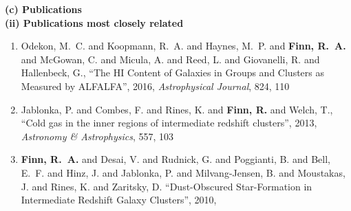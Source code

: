 \documentclass[11pt]{article}
\begin{document}
\begin{flushleft}
\medskip
{\bf (c) Publications} \\
\medskip
{\bf (ii) Publications most closely related} \\
\begin{enumerate}{\setlength{\leftmargin}{0in}}
\vspace{-.2cm}\item {{Odekon}, M.~C. and {Koopmann}, R.~A. and {Haynes}, M.~P. and 
	{\bf{Finn}, R.~A.} and {McGowan}, C. and {Micula}, A. and {Reed}, L. and 
	{Giovanelli}, R. and {Hallenbeck}, G.}, ``{The HI Content of
        Galaxies in Groups and Clusters as Measured by ALFALFA}'',
      2016, {\it Astrophysical Journal},
      824, 110
\vspace{-.2cm}\item {Jablonka}, P. and {Combes}, F. and {Rines}, K. and {\bf {Finn}, R.} and 
	{Welch}, T., ``{Cold gas in the inner regions of intermediate
        redshift clusters}'', 2013, {\it Astronomy \& Astrophysics},
      557, 103
\vspace{-.2cm}
\item {\bf {Finn}, R.~A.} and {Desai}, V. and {Rudnick}, G. and {Poggianti}, B. and 
	{Bell}, E.~F. and {Hinz}, J. and {Jablonka}, P. and {Milvang-Jensen}, B. and 
	{Moustakas}, J. and {Rines}, K. and {Zaritsky}, D.
``Dust-Obscured Star-Formation in Intermediate Redshift Galaxy Clusters'', 2010,

\end{enumerate}
\end{flushleft}
\end{document}
